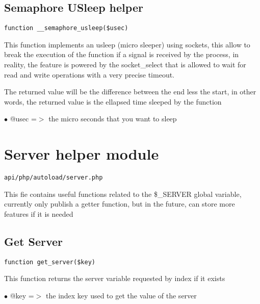 \documentclass[a4paper]{book}
\begin{document}
\hypertarget{toc240}{}
\subsection{Semaphore USleep helper}

\begin{lstlisting}
function __semaphore_usleep($usec)
\end{lstlisting}

This function implements an usleep (micro sleeper) using sockets, this
allow to break the execution of the function if a signal is received by
the process, in reality, the feature is powered by the socket\_select that
is allowed to wait for read and write operations with a very precise
timeout.

The returned value will be the difference between the end less the start,
in other words, the returned value is the ellapsed time sleeped by the
function

\begin{compactitem}
\item[\color{myblue}$\bullet$] @usec =$>$ the micro seconds that you want to sleep
\end{compactitem}

\hypertarget{toc241}{}
\section{Server helper module}

\begin{lstlisting}
api/php/autoload/server.php
\end{lstlisting}

This fie contains useful functions related to the \$\_SERVER global variable, currently only publish
a getter function, but in the future, can store more features if it is needed

\hypertarget{toc242}{}
\subsection{Get Server}

\begin{lstlisting}
function get_server($key)
\end{lstlisting}

This function returns the server variable requested by index if it exists

\begin{compactitem}
\item[\color{myblue}$\bullet$] @key =$>$ the index key used to get the value of the server
\end{compactitem}
\end{document}

